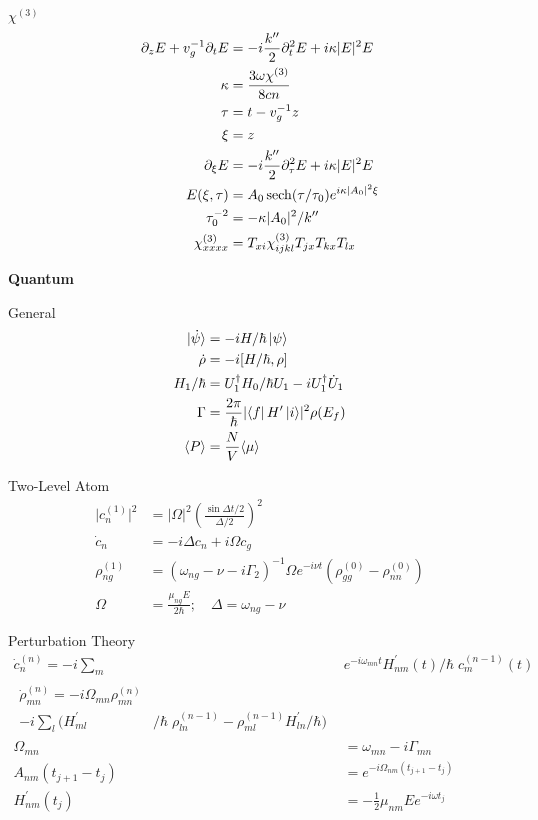 \documentclass[12pt]{article}
\begin{document}
\begin{multicols}{2}
  $\chi^{(3)}$
  \begin{align}
    \partial_z E + v_g^{-1} \partial_t E &= -i \frac{k^{\prime\prime}}{2} \partial_t^2 E
    + i \kappa \lvert E \rvert^2 E\\
    \kappa &= \frac{3 \omega \chi^{(3)}}{8 c n}\\
    \tau &= t - v_g^{-1} z\\
    \xi &= z\\
    \partial_\xi E &= -i \frac{k^{\prime\prime}}{2} \partial_\tau^2 E + i \kappa \lvert E \rvert^2 E\\
    E(\xi, \tau) &= A_0 \sech(\tau/\tau_0) e^{i\kappa \lvert A_0 \rvert^2 \xi}\\
    \tau_0^{-2} &= -\kappa \lvert A_0 \rvert^2 / k^{\prime\prime}\\
    \chi_{xxxx}^{(3)} &= T_{xi} \chi^{(3)}_{ijkl} T_{jx} T_{kx} T_{lx}
  \end{align}

  \textbf{Quantum}
  
  General
  \begin{align}
    \ket*{\dot{\psi}} &= -iH/\hbar\ket{\psi}\\
    \dot{\rho} &= -i [H/\hbar, \rho]\\
    H_1/\hbar &= U_1^{\dagger}H_0/\hbar U_1 - i U_{1}^{\dagger}\dot{U}_1\\
    \Gamma &= \frac{2\pi}{\hbar} \lvert \bra{f} H^{\prime} \ket{i} \rvert^2 \rho(E_f)\\
    \langle P \rangle &= \frac{N}{V}\langle \mu \rangle
  \end{align}

    Two-Level Atom
  \begin{align}
    \lvert c_n^{(1)} \rvert^2 &= \lvert \Omega \rvert^2 (\frac{\sin \Delta t / 2}{\Delta / 2})^2\\
    \dot{c}_n &= -i \Delta c_n + i \Omega c_g\\
    \rho_{ng}^{(1)} &= (\omega_{ng} - \nu - i\Gamma_2)^{-1} \Omega e^{-i\nu t}(\rho_{gg}^{(0)} - \rho_{nn}^{(0)})\\
    \Omega &= \frac{\mu_{ng} E}{2 \hbar}; \quad \Delta = \omega_{ng} - \nu
  \end{align}

  Perturbation Theory
  \begin{align}
    \dot{c}_{n}^{(n)} = -i \sum_m &e^{-i\omega_{mn} t} H_{nm}^{\prime}(t)/\hbar \; c_{m}^{(n - 1)}(t)\\ %
    \begin{split}
      \dot{\rho}_{mn}^{(n)} = -i \Omega_{mn} \rho_{mn}^{(n)}&\\
      -i \sum_{l} (H^{\prime}_{ml}&/\hbar \; \rho_{ln}^{(n - 1)} - \rho_{ml}^{(n - 1)} H^{\prime}_{ln}/\hbar) %
    \end{split}\\
    \Omega_{mn} &= \omega_{mn} - i\Gamma_{mn}\\
    A_{nm}(t_{j + 1} - t_j) &= e^{-i\Omega_{nm}(t_{j+1} - t_j)}\\
    H^{\prime}_{nm}(t_j) &= -\frac{1}{2}\mu_{nm}Ee^{-i\omega t_j}
  \end{align}


\end{multicols}
\end{document}
